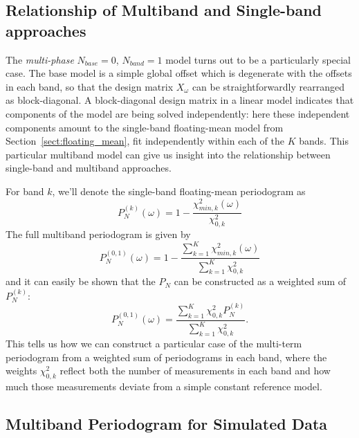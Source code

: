 \documentclass[12pt,preprint]{aastex}
\newcommand{\Sect}[1]{Section~\ref{sect:#1}}
\newcommand{\sect}[1]{\Sect{#1}}
\newcommand{\sectlabel}[1]{\label{sect:#1}}
\begin{document}
\subsection{Relationship of Multiband and Single-band approaches}
\sectlabel{relationship}
The {\it multi-phase} $N_{base}=0$, $N_{band}=1$ model turns out to be a particularly special case.
The base model is a simple global offset which is degenerate with the offsets in each band, so that the design matrix $X_\omega$ can be straightforwardly rearranged as block-diagonal. A block-diagonal design matrix in a linear model indicates that components of the model are being solved independently: here these independent components amount to the single-band floating-mean model from \sect{floating_mean}, fit independently within each of the $K$ bands. This particular multiband model can give us insight into the relationship between single-band and multiband approaches.

For band $k$, we'll denote the single-band floating-mean periodogram as
\begin{equation}
  P_N^{(k)}(\omega) = 1 - \frac{\chi^2_{min, k}(\omega)}{\chi^2_{0,k}}
\end{equation}
The full multiband periodogram is given by
\begin{equation}
  P_N^{(0,1)}(\omega) = 1 - \frac{\sum_{k=1}^K\chi^2_{min, k}(\omega)}{\sum_{k=1}^K\chi^2_{0,k}}
\end{equation}
and it can easily be shown that the $P_N$ can be constructed as a weighted sum of $P_N^{(k)}$:
\begin{equation}
  P_N^{(0,1)}(\omega) = \frac{\sum_{k=1}^K\chi^2_{0,k}P_N^{(k)}}{\sum_{k=1}^K\chi^2_{0,k}}.
\end{equation}
This tells us how we can construct a particular case of the multi-term periodogram from a weighted sum of periodograms in each band, where the weights $\chi^2_{0,k}$ reflect both the number of measurements in each band and how much those measurements deviate from a simple constant reference model.

\subsection{Multiband Periodogram for Simulated Data}
\sectlabel{Simulated}
\end{document}
